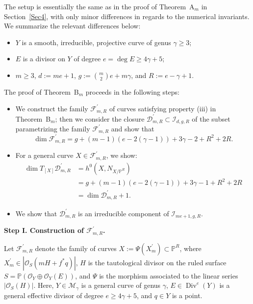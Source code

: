 \documentclass[a4paper,12pt]{amsart}
\def\dim{\operatorname{dim}}
\def\Div{\operatorname{Div}}%
\begin{document}
The setup is essentially the same as in the proof of \textnormal{Theorem~A$_m$} in Section~\ref{Sec4}, with only minor differences in regards to the numerical invariants. We summarize the relevant differences below:

\begin{itemize}[label=\textbullet, leftmargin=1cm, font=\rmfamily]
\item $Y$ is a smooth, irreducible, projective curve of genus $\gamma \geq 3$;

\item $E$ is a divisor on $Y$ of degree $e = \deg E \geq 4\gamma + 5$;

\item $m \geq 3$, $d := me+1$, $g := \binom{m}{2}e + m\gamma$, and $R := e - \gamma + 1$.
\end{itemize}



The proof of \textnormal{Theorem~B$_m$} proceeds in the following steps:
\begin{itemize}[font=\sffamily, leftmargin=1.8cm, style=nextline]
 \item[{\rm \bf Step I.}] We construct the family $\mathcal{F}^{\prime}_{m,R}$ of curves satisfying property \textnormal{(iii)} in \textnormal{Theorem~B$_m$}; then we consider the closure $\mathcal{D}^{\prime}_{m,R} \subset \mathcal{I}_{d, g, R}$ of the subset parametrizing the family $\mathcal{F}^{\prime}_{m,R}$ and show that
 \[
  \dim \mathcal{F}^{\prime}_{m,R} = g + (m - 1)(e - 2(\gamma - 1)) + 3\gamma - 2 + R^2 + 2R.
 \]

 \item[{\rm \bf Step II.}] For a general curve $X \in \mathcal{F}^{\prime}_{m,R}$, we show:
 \[
 \begin{aligned}
 \dim T_{[X]} \mathcal{D}^{\prime}_{m,R} &= h^0(X, N_{X / \mathbb{P}^{R}}) \\
 &= g + (m - 1)(e - 2(\gamma - 1)) + 3\gamma - 1 + R^2 + 2R \\
 &= \dim \mathcal{D}^{\prime}_{m,R} + 1.
 \end{aligned}
 \]

 \item[{\rm \bf Step III.}] We show that $\mathcal{D}^{\prime}_{m,R}$ is an irreducible component of $\mathcal{I}_{me+1, g, R}$.
\end{itemize}

{\bf Step I. Construction of $\mathcal{F}^{\prime}_{m,R}$.}

Let $\mathcal{F}^{\prime}_{m,R}$ denote the family of curves $X := \Psi (X^{\prime}_m) \subset \mathbb{P}^{R}$, where $X^{\prime}_m \in |\mathcal{O}_S (mH + f^{\ast}q)|$, $H$ is the tautological divisor on the ruled surface $S = \mathbb{P} (\mathcal{O}_Y \oplus \mathcal{O}_Y (E))$, and $\Psi$ is the morphism associated to the linear series $|\mathcal{O}_S (H)|$. Here, $Y \in \mathcal{M}_{\gamma}$ is a general curve of genus $\gamma$, $E \in \Div^e (Y)$ is a general effective divisor of degree $e \geq 4\gamma + 5$, and $q \in Y$ is a point.
\end{document}

